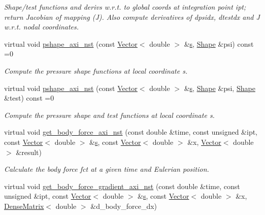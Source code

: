 \begin{DoxyCompactItemize}
\begin{DoxyCompactList}\small\item\em Shape/test functions and derivs w.\+r.\+t. to global coords at integration point ipt; return Jacobian of mapping (J). Also compute derivatives of dpsidx, dtestdx and J w.\+r.\+t. nodal coordinates. \end{DoxyCompactList}\item 
virtual void \hyperlink{classoomph_1_1AxisymmetricNavierStokesEquations_a6309780fd1964c4df0cca0818ccff158}{pshape\+\_\+axi\+\_\+nst} (const \hyperlink{classoomph_1_1Vector}{Vector}$<$ double $>$ \&\hyperlink{cfortran_8h_ab7123126e4885ef647dd9c6e3807a21c}{s}, \hyperlink{classoomph_1_1Shape}{Shape} \&psi) const =0
\begin{DoxyCompactList}\small\item\em Compute the pressure shape functions at local coordinate s. \end{DoxyCompactList}\item 
virtual void \hyperlink{classoomph_1_1AxisymmetricNavierStokesEquations_a19a4135581356bf368a7ecae2b315f85}{pshape\+\_\+axi\+\_\+nst} (const \hyperlink{classoomph_1_1Vector}{Vector}$<$ double $>$ \&\hyperlink{cfortran_8h_ab7123126e4885ef647dd9c6e3807a21c}{s}, \hyperlink{classoomph_1_1Shape}{Shape} \&psi, \hyperlink{classoomph_1_1Shape}{Shape} \&test) const =0
\begin{DoxyCompactList}\small\item\em Compute the pressure shape and test functions at local coordinate s. \end{DoxyCompactList}\item 
virtual void \hyperlink{classoomph_1_1AxisymmetricNavierStokesEquations_adf10fc1309b9aeb92dc11be274ae65a2}{get\+\_\+body\+\_\+force\+\_\+axi\+\_\+nst} (const double \&time, const unsigned \&ipt, const \hyperlink{classoomph_1_1Vector}{Vector}$<$ double $>$ \&\hyperlink{cfortran_8h_ab7123126e4885ef647dd9c6e3807a21c}{s}, const \hyperlink{classoomph_1_1Vector}{Vector}$<$ double $>$ \&x, \hyperlink{classoomph_1_1Vector}{Vector}$<$ double $>$ \&result)
\begin{DoxyCompactList}\small\item\em Calculate the body force fct at a given time and Eulerian position. \end{DoxyCompactList}\item 
virtual void \hyperlink{classoomph_1_1AxisymmetricNavierStokesEquations_ab4a21f4cfb33ae0561d572126d672964}{get\+\_\+body\+\_\+force\+\_\+gradient\+\_\+axi\+\_\+nst} (const double \&time, const unsigned \&ipt, const \hyperlink{classoomph_1_1Vector}{Vector}$<$ double $>$ \&\hyperlink{cfortran_8h_ab7123126e4885ef647dd9c6e3807a21c}{s}, const \hyperlink{classoomph_1_1Vector}{Vector}$<$ double $>$ \&x, \hyperlink{classoomph_1_1DenseMatrix}{Dense\+Matrix}$<$ double $>$ \&d\+\_\+body\+\_\+force\+\_\+dx)

\end{DoxyCompactItemize}
